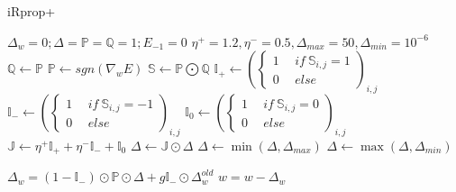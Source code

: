 \documentclass[11pt,oneside,a4paper]{scrartcl} %
\renewcommand{\S}{\mathbb{S}}
\renewcommand{\P}{\mathbb{P}}
\newcommand{\Q}{\mathbb{Q}}
\newcommand{\I}{\mathbb{I}}
\newcommand{\J}{\mathbb{J}}
\begin{document}
\thispagestyle{empty}
\begin{algorithm}
\caption{iRprop+}\label{iRprop+}
\begin{algorithmic}[1]
\State $\Delta_w = 0; \Delta = \mathbb{P} = \mathbb{Q} = 1; E_{-1}=0$
\State $\eta^+ = 1.2, \eta^- = 0.5, \Delta_{max} = 50, \Delta_{min}= 10^{-6}$
\EndProcedure
{}\\
\State $\Q\gets \P$
\State $\P\gets \mathit{sgn}(\nabla_wE)$ 
\State $\S\gets \P\bigodot \Q$ 
\State $\I_+ \gets \left( \begin{cases}
1 & \mathit{~~if~}\S_{i,j} = 1 \\ 0 &\mathit{~~else~} 
\end{cases}\right)_{i,j}$
\State $\I_- \gets \left( \begin{cases}
1 & \mathit{~~if~}\S_{i,j} = -1 \\ 0 &\mathit{~~else~} 
\end{cases}\right)_{i,j}$
\State $\I_0 \gets \left( \begin{cases}
1 & \mathit{~~if~}\S_{i,j} = 0 \\ 0 &\mathit{~~else~} 
\end{cases}\right)_{i,j}$\\

\State $\J \gets \eta^+\I_+ + \eta^-\I_- + \I_0$
\State $\Delta \gets \J\odot\Delta$
\State $\Delta \gets \min(\Delta, \Delta_{max})$
\State $\Delta \gets \max(\Delta, \Delta_{min})$

\State $\Delta_w = (1-\I_-)\odot \P \odot \Delta + g\I_- \odot \Delta^{old}_w$
\State $w = w- \Delta_w$
\EndProcedure
\end{algorithmic}
\end{algorithm}
\end{document}

